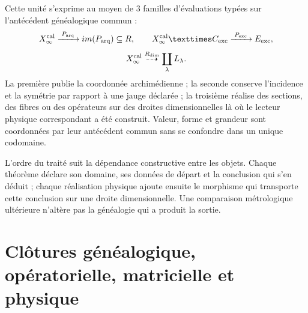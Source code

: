 Cette unité s'exprime au moyen de \(3\) familles d'évaluations typées sur
l'antécédent généalogique commun :
\[
 \mathcal X_\infty^{\rm cal}
 \xrightarrow{\;\mathcal P_{\rm arq}\;}
 \operatorname{im}(\mathcal P_{\rm arq})\subseteq\mathbb R,
 \qquad
 \mathcal X_\infty^{\rm cal}\times\mathcal C_{\rm exc}
 \xrightarrow{\;\mathcal P_{\rm exc}\;}
 \mathcal E_{\rm exc},
\]
\[
 \mathcal X_\infty^{\rm cal}
 \overset{\mathcal R_{\rm dim}}{\dashrightarrow}
 \coprod_{\lambda}\mathcal L_\lambda .
\]
La première publie la coordonnée archimédienne ; la seconde conserve
l'incidence et la symétrie par rapport à une jauge déclarée ; la troisième réalise
des sections, des fibres ou des opérateurs sur des droites dimensionnelles là où le
lecteur physique correspondant a été construit. Valeur, forme et grandeur sont
coordonnées par leur antécédent commun sans se confondre dans un unique codomaine.

L'ordre du traité suit la dépendance constructive entre les objets.
Chaque théorème déclare son domaine, ses données de départ et la conclusion qui s'en
déduit ; chaque réalisation physique ajoute ensuite le morphisme qui
transporte cette conclusion sur une droite dimensionnelle. Une comparaison
métrologique ultérieure n'altère pas la généalogie qui a produit la sortie.

\section*{Clôtures généalogique, opératorielle, matricielle et physique}

